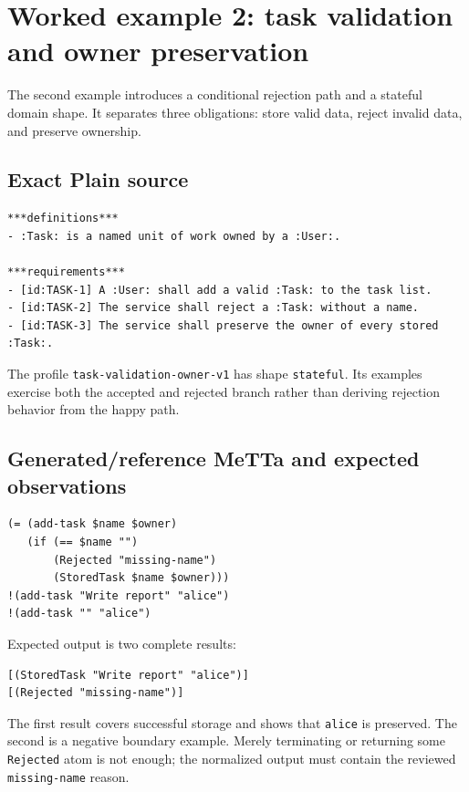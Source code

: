 \documentclass[11pt]{article}
\newcommand{\code}[1]{\texttt{#1}}
\begin{document}
\section{Worked example 2: task validation and owner preservation}

The second example introduces a conditional rejection path and a stateful
domain shape.  It separates three obligations: store valid data, reject
invalid data, and preserve ownership.

\subsection{Exact Plain source}

\begin{lstlisting}[language={}]
***definitions***
- :Task: is a named unit of work owned by a :User:.

***requirements***
- [id:TASK-1] A :User: shall add a valid :Task: to the task list.
- [id:TASK-2] The service shall reject a :Task: without a name.
- [id:TASK-3] The service shall preserve the owner of every stored :Task:.
\end{lstlisting}

The profile \code{task-validation-owner-v1} has shape \code{stateful}.  Its
examples exercise both the accepted and rejected branch rather than deriving
rejection behavior from the happy path.

\subsection{Generated/reference MeTTa and expected observations}

\begin{lstlisting}[language={}]
(= (add-task $name $owner)
   (if (== $name "")
       (Rejected "missing-name")
       (StoredTask $name $owner)))
!(add-task "Write report" "alice")
!(add-task "" "alice")
\end{lstlisting}

Expected output is two complete results:

\begin{lstlisting}[language={}]
[(StoredTask "Write report" "alice")]
[(Rejected "missing-name")]
\end{lstlisting}

The first result covers successful storage and shows that \code{alice} is
preserved.  The second is a negative boundary example.  Merely terminating or
returning some \code{Rejected} atom is not enough; the normalized output must
contain the reviewed \code{missing-name} reason.
\end{document}
